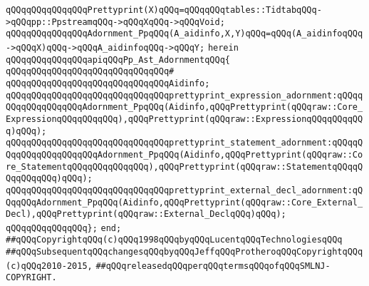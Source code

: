 \newline
\verb|qQQqqQQqqQQqqQQqPrettyprint(X)qQQq=qQQqqQQqtables::TidtabqQQq->qQQqpp::PpstreamqQQq->qQQqXqQQq->qQQqVoid;|\newline
\newline
\verb|qQQqqQQqqQQqqQQqAdornment_PpqQQq(A_aidinfo,X,Y)qQQq=qQQq(A_aidinfoqQQq->qQQqX)qQQq->qQQqA_aidinfoqQQq->qQQqY;|\newline
\verb|herein|\newline
\newline
\verb|qQQqqQQqqQQqqQQqapiqQQqPp_Ast_AdornmentqQQq{|\newline
\verb|qQQqqQQqqQQqqQQqqQQqqQQqqQQqqQQq#|\newline
\verb|qQQqqQQqqQQqqQQqqQQqqQQqqQQqqQQqAidinfo;|\newline
\verb|qQQqqQQqqQQqqQQqqQQqqQQqqQQqqQQqprettyprint_expression_adornment:qQQqqQQqqQQqqQQqqQQqAdornment_PpqQQq(Aidinfo,qQQqPrettyprint(qQQqraw::Core_ExpressionqQQqqQQqqQQq),qQQqPrettyprint(qQQqraw::ExpressionqQQqqQQqqQQq)qQQq);|\newline
\verb|qQQqqQQqqQQqqQQqqQQqqQQqqQQqqQQqprettyprint_statement_adornment:qQQqqQQqqQQqqQQqqQQqqQQqAdornment_PpqQQq(Aidinfo,qQQqPrettyprint(qQQqraw::Core_StatementqQQqqQQqqQQqqQQq),qQQqPrettyprint(qQQqraw::StatementqQQqqQQqqQQqqQQq)qQQq);|\newline
\verb|qQQqqQQqqQQqqQQqqQQqqQQqqQQqqQQqprettyprint_external_decl_adornment:qQQqqQQqAdornment_PpqQQq(Aidinfo,qQQqPrettyprint(qQQqraw::Core_External_Decl),qQQqPrettyprint(qQQqraw::External_DeclqQQq)qQQq);|\newline
\verb|qQQqqQQqqQQqqQQq};|\newline
\verb|end;|\newline
\newline
\newline
\verb|##qQQqCopyrightqQQq(c)qQQq1998qQQqbyqQQqLucentqQQqTechnologiesqQQq|\newline
\verb|##qQQqSubsequentqQQqchangesqQQqbyqQQqJeffqQQqProtheroqQQqCopyrightqQQq(c)qQQq2010-2015,|\newline
\verb|##qQQqreleasedqQQqperqQQqtermsqQQqofqQQqSMLNJ-COPYRIGHT.|\newline

